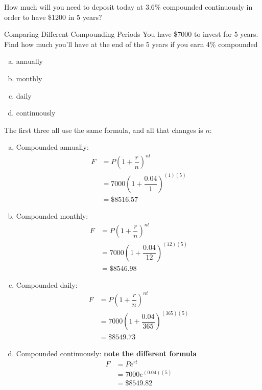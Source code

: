 \begin{try}
How much will you need to deposit today at 3.6\% compounded continuously in order to have \$1200 in 5 years?
\end{try}
\vfill
\text{}
\vfill
\pagebreak

\begin{example}{Comparing Different Compounding Periods}
You have \$7000 to invest for 5 years.  Find how much you'll have at the end of the 5 years if you earn 4\% compounded
\begin{enumerate}[(a)]
\item annually
\item monthly
\item daily
\item continuously
\end{enumerate}

\sol
The first three all use the same formula, and all that changes is $n$:
\begin{enumerate}[(a)]
\item Compounded annually:
\begin{align*}
F &= P\left(1+\dfrac{r}{n}\right)^{nt}\\
&= 7000\left(1+\dfrac{0.04}{1}\right)^{(1)(5)}\\
&= \$8516.57
\end{align*}

\item Compounded monthly:
\begin{align*}
F &= P\left(1+\dfrac{r}{n}\right)^{nt}\\
&= 7000\left(1+\dfrac{0.04}{12}\right)^{(12)(5)}\\
&= \$8546.98
\end{align*}

\item Compounded daily:
\begin{align*}
F &= P\left(1+\dfrac{r}{n}\right)^{nt}\\
&= 7000\left(1+\dfrac{0.04}{365}\right)^{(365)(5)}\\
&= \$8549.73
\end{align*}

\item Compounded continuously: \textbf{note the different formula}
\begin{align*}
F &= Pe^{rt}\\
&= 7000e^{(0.04)(5)}\\
&= \$8549.82
\end{align*}
\end{enumerate}
\end{example}

